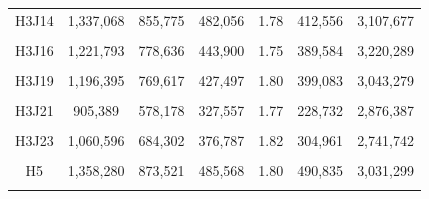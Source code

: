 \documentclass[
  a4paper,
  titlepage]{article}
\begin{document}
\begin{longtable}[t]{ccccccc}
H3J14 & 1,337,068 & 855,775 & 482,056 & 1.78 & 412,556 & 3,107,677\\
 
\cellcolor{gray!6}{H3J15} & \cellcolor{gray!6}{1,393,718} & \cellcolor{gray!6}{895,468} & \cellcolor{gray!6}{499,156} & \cellcolor{gray!6}{1.79} & \cellcolor{gray!6}{526,322} & \cellcolor{gray!6}{3,111,893}\\
 
H3J16 & 1,221,793 & 778,636 & 443,900 & 1.75 & 389,584 & 3,220,289\\
 
\cellcolor{gray!6}{H3J18} & \cellcolor{gray!6}{1,217,350} & \cellcolor{gray!6}{783,250} & \cellcolor{gray!6}{434,772} & \cellcolor{gray!6}{1.80} & \cellcolor{gray!6}{470,393} & \cellcolor{gray!6}{2,944,355}\\
 
H3J19 & 1,196,395 & 769,617 & 427,497 & 1.80 & 399,083 & 3,043,279\\
 
\cellcolor{gray!6}{H3J20} & \cellcolor{gray!6}{1,232,090} & \cellcolor{gray!6}{785,441} & \cellcolor{gray!6}{447,289} & \cellcolor{gray!6}{1.76} & \cellcolor{gray!6}{376,375} & \cellcolor{gray!6}{3,156,952}\\
 
H3J21 & 905,389 & 578,178 & 327,557 & 1.77 & 228,732 & 2,876,387\\
 
\cellcolor{gray!6}{H3J22} & \cellcolor{gray!6}{1,045,616} & \cellcolor{gray!6}{669,637} & \cellcolor{gray!6}{376,494} & \cellcolor{gray!6}{1.78} & \cellcolor{gray!6}{305,719} & \cellcolor{gray!6}{3,014,280}\\
 
H3J23 & 1,060,596 & 684,302 & 376,787 & 1.82 & 304,961 & 2,741,742\\
 
\cellcolor{gray!6}{H4} & \cellcolor{gray!6}{1,138,952} & \cellcolor{gray!6}{726,699} & \cellcolor{gray!6}{412,890} & \cellcolor{gray!6}{1.76} & \cellcolor{gray!6}{352,502} & \cellcolor{gray!6}{3,000,358}\\
 
H5 & 1,358,280 & 873,521 & 485,568 & 1.80 & 490,835 & 3,031,299\\
 
\cellcolor{gray!6}{H8} & \cellcolor{gray!6}{1,086,355} & \cellcolor{gray!6}{694,879} & \cellcolor{gray!6}{392,005} & \cellcolor{gray!6}{1.77} & \cellcolor{gray!6}{302,648} & \cellcolor{gray!6}{2,860,338}\\
 

\end{longtable}
\end{document}
